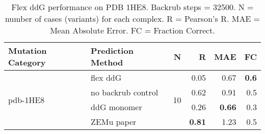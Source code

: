 \begin{table}
  \begin{tabular}{llrrrr}
\toprule
Mutation Category &   Prediction Method &   N &    R &  MAE &  FC \\
\midrule
 \multirow{ 4}{*}{pdb-1HE8} & flex ddG & \multirow{ 4}{*}{10} & 0.05 & 0.67 & \textbf{0.6}  \\
 & no backrub control & & 0.62 & 0.91 & 0.5  \\
 & ddG monomer & & 0.26 & \textbf{0.66} & 0.3  \\
 & ZEMu paper & & \textbf{0.81} & 1.23 & 0.5  \\
\bottomrule
\end{tabular}
  \caption[Flex ddG performance on PDB 1HE8]{
    Flex ddG performance on PDB 1HE8. Backrub steps = 32500. N = number of cases (variants) for each complex. R = Pearson's R. MAE = Mean Absolute Error. FC = Fraction Correct.
  } \label{tab:table-pdb-1HE8}
\end{table}
